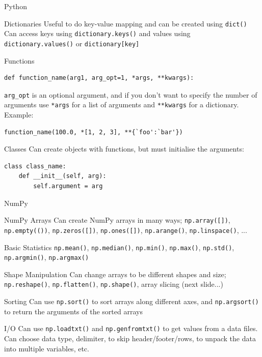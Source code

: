 \documentclass{beamer}
\begin{document}
\begin{frame}[fragile]{Python}
  \fontsize{10pt}{10}\selectfont
  \begin{block}{Dictionaries}
  	Useful to do key-value mapping and can be created using \texttt{dict()} \\
  	Can access keys using \texttt{dictionary.keys()} and values using \texttt{dictionary.values()} or \texttt{dictionary[key]}
  \end{block}
  \begin{block}{Functions}
       \begin{lstlisting} 
def function_name(arg1, arg_opt=1, *args, **kwargs):
       \end{lstlisting}
       \texttt{arg\_opt} is an optional argument, and if you don't want to specify the number of arguments use \texttt{*args} for a list of arguments and \texttt{**kwargs} for a dictionary. Example:
       \begin{lstlisting}
function_name(100.0, *[1, 2, 3], **{`foo':`bar'})
       \end{lstlisting}
  \end{block}
  \begin{block}{Classes}
       Can create objects with functions, but must initialise the arguments:
       \begin{lstlisting}
class class_name:
    def __init__(self, arg):
        self.argument = arg
       \end{lstlisting} 
  \end{block}
\end{frame}

\begin{frame}{NumPy}
  \fontsize{9pt}{9}\selectfont
  \begin{block}{NumPy Arrays}
      Can create NumPy arrays in many ways; \texttt{np.array([])}, \texttt{np.empty(())}, \texttt{np.zeros([])}, \texttt{np.ones([])}, \texttt{np.arange()}, \texttt{np.linspace()}, ...
  \end{block}
  \begin{block}{Basic Statistics}
     \texttt{np.mean()}, \texttt{np.median()}, \texttt{np.min()}, \texttt{np.max()}, \texttt{np.std()}, \texttt{np.argmin()}, \texttt{np.argmax()}
  \end{block}
  \begin{block}{Shape Manipulation}
    Can change arrays to be different shapes and size; \texttt{np.reshape()}, \texttt{np.flatten()}, \texttt{np.shape()}, array slicing (next slide...)
  \end{block}    
  \begin{block}{Sorting}
     Can use \texttt{np.sort()} to sort arrays along different axes, and \texttt{np.argsort()} to return the arguments of the sorted arrays
  \end{block}    
  \begin{block}{I/O}
     Can use \texttt{np.loadtxt()} and \texttt{np.genfromtxt()} to get values from a data files. Can choose data type, delimiter, to skip header/footer/rows, to unpack the data into multiple variables, etc. 
  \end{block}     
\end{frame}
\end{document}
